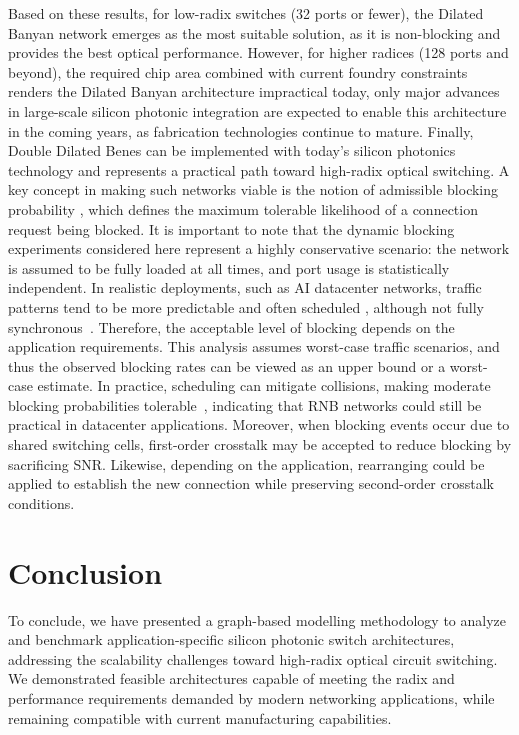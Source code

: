 Based on these results, for low-radix switches (32 ports or fewer), the Dilated Banyan network emerges as the most suitable solution, as it is non-blocking and provides the best optical performance.
However, for higher radices (128 ports and beyond), the required chip area combined with current foundry constraints renders the Dilated Banyan architecture impractical today, only major advances in large-scale silicon photonic integration are expected to enable this architecture in the coming years, as fabrication technologies continue to mature.
Finally, Double Dilated Benes can be implemented with today’s silicon photonics technology and represents a practical path toward high-radix optical switching.
A key concept in making such networks viable is the notion of admissible blocking probability \cite{taniguchiOpticalCircuitSwitched2024a,okiDesignModelThreestage2025}, which defines the maximum tolerable likelihood of a connection request being blocked.
It is important to note that the dynamic blocking experiments considered here represent a highly conservative scenario: the network is assumed to be fully loaded at all times, and port usage is statistically independent.
In realistic deployments, such as AI datacenter networks, traffic patterns tend to be more predictable and often scheduled \cite{wangTopoopTCooptimizingNetwork,liaoMixNetRuntimeReconfigurable2025,addanki2025vermilion}, although not fully synchronous~\cite{8535157}.
Therefore, the acceptable level of blocking depends on the application requirements.
This analysis assumes worst-case traffic scenarios, and thus the observed blocking rates can be viewed as an upper bound or a worst-case estimate.
In practice, scheduling can mitigate collisions, making moderate blocking probabilities tolerable~\cite{weintraub2025packetloss, lin2018deep}, indicating that RNB networks could still be practical in datacenter applications.
Moreover, when blocking events occur due to shared switching cells, first-order crosstalk may be accepted to reduce blocking by sacrificing SNR. Likewise, depending on the application, rearranging could be applied to establish the new connection while preserving second-order crosstalk conditions.
\section{Conclusion}\label{sec:ch4_conclusion}
To conclude, we have presented a graph-based modelling methodology to analyze and benchmark application-specific silicon photonic switch architectures, addressing the scalability challenges toward high-radix optical circuit switching.
We demonstrated feasible architectures capable of meeting the radix and performance requirements demanded by modern networking applications, while remaining compatible with current manufacturing capabilities.

